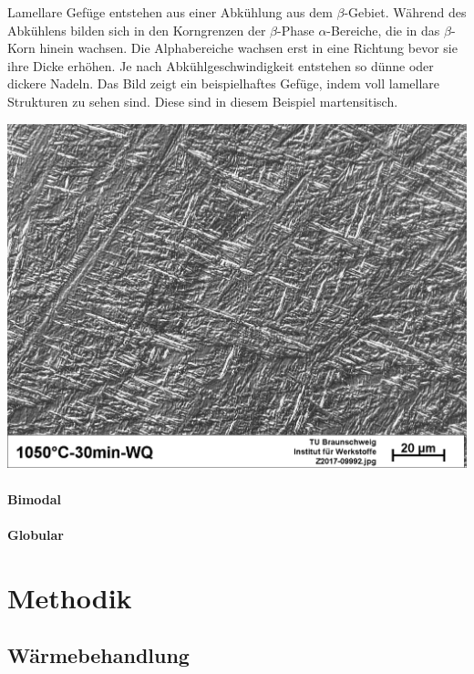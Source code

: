 \documentclass[a4paper, 11pt]{tubsreprt}
\begin{document}
Lamellare Gefüge entstehen aus einer Abkühlung aus dem $\beta$-Gebiet. Während des Abkühlens bilden sich in den Korngrenzen der $\beta$-Phase $\alpha$-Bereiche, die in das $\beta$-Korn hinein wachsen. Die Alphabereiche wachsen erst in eine Richtung bevor sie ihre Dicke erhöhen. Je nach Abkühlgeschwindigkeit entstehen so dünne oder dickere Nadeln. Das Bild zeigt ein beispielhaftes Gefüge, indem voll lamellare Strukturen zu sehen sind. Diese sind in diesem Beispiel martensitisch. 

\begin{minipage}{\textwidth}


	\centering
		\includegraphics[scale=0.5]{Bilder/Vollmartensit.jpg}
		\label{fig1}
		
\end{minipage}

\subsubsection{Bimodal}
\subsubsection{Globular}
\chapter{Methodik}
\section{Wärmebehandlung}
\end{document}
